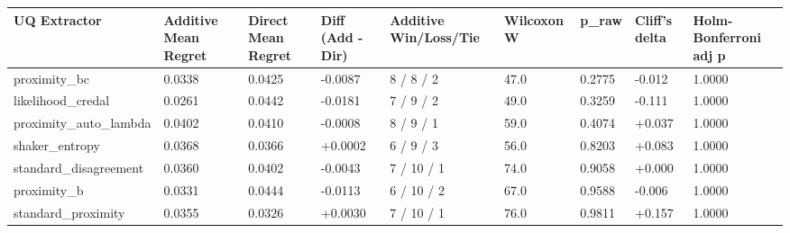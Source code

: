 \begin{tabular}{lllllllll}
\toprule
UQ Extractor & Additive Mean Regret & Direct Mean Regret & Diff (Add - Dir) & Additive Win/Loss/Tie & Wilcoxon W & p_raw & Cliff's delta & Holm-Bonferroni adj p \\
\midrule
proximity_bc & 0.0338 & 0.0425 & -0.0087 & 8 / 8 / 2 & 47.0 & 0.2775 & -0.012 & 1.0000 \\
likelihood_credal & 0.0261 & 0.0442 & -0.0181 & 7 / 9 / 2 & 49.0 & 0.3259 & -0.111 & 1.0000 \\
proximity_auto_lambda & 0.0402 & 0.0410 & -0.0008 & 8 / 9 / 1 & 59.0 & 0.4074 & +0.037 & 1.0000 \\
shaker_entropy & 0.0368 & 0.0366 & +0.0002 & 6 / 9 / 3 & 56.0 & 0.8203 & +0.083 & 1.0000 \\
standard_disagreement & 0.0360 & 0.0402 & -0.0043 & 7 / 10 / 1 & 74.0 & 0.9058 & +0.000 & 1.0000 \\
proximity_b & 0.0331 & 0.0444 & -0.0113 & 6 / 10 / 2 & 67.0 & 0.9588 & -0.006 & 1.0000 \\
standard_proximity & 0.0355 & 0.0326 & +0.0030 & 7 / 10 / 1 & 76.0 & 0.9811 & +0.157 & 1.0000 \\
\bottomrule
\end{tabular}
